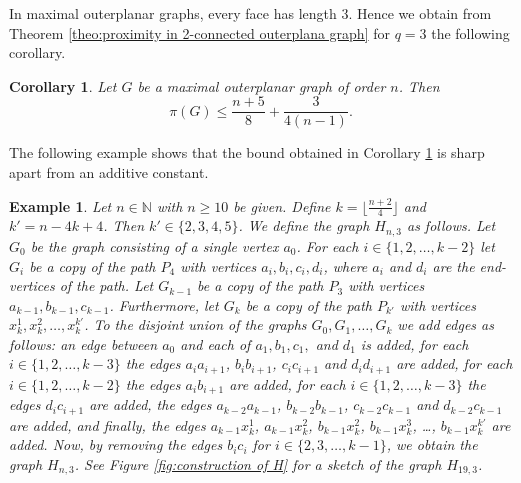 \documentclass[a4paper,11pt]{article}
\newtheorem{corollary}[theorem]%
{Corollary}
\newtheorem{example}{Example}[section]
\numberwithin{equation}{theorem}
\begin{document}
In maximal outerplanar graphs, every face has length $3$. Hence we obtain 
from Theorem \ref{theo:proximity in 2-connected outerplana graph} for $q=3$
the following corollary. 

\begin{corollary}  \label{coro:proximity-in-mops}
Let $G$ be a maximal outerplanar graph of order $n$. Then 
\[ \pi(G) \leq  \frac{n+5}{8} + \frac{3}{4(n-1)}. \]
\end{corollary}

The following example shows that the bound obtained in Corollary \ref{coro:proximity-in-mops}
is sharp apart from an additive constant.


\begin{example}{\rm
Let $n \in \mathbb{N}$ with $n \geq 10$ be given. 
Define $k = \lfloor \frac{n+2}{4}\rfloor$ and $k' = n-4k+4$. Then $k' \in \{2, 3, 4, 5\}$. 
We define the graph $H_{n,3}$ as follows. Let $G_0$ be the graph consisting of a single vertex $a_0$. 
For each $i \in \{1, 2, \ldots, k-2\}$ let $G_i$ be a copy of the path $P_4$ with vertices $a_i, b_i, c_i, d_i$, 
where $a_i$ and $d_i$ are the end-vertices of the path. Let $G_{k-1}$ be a copy of the path $P_3$ with vertices 
$a_{k-1}, b_{k-1}, c_{k-1}$. Furthermore, let $G_k$ be a copy of the path $P_{k'}$ with vertices 
$x^1_k, x^2_k, \ldots, x^{k'}_k$. To the disjoint union of the graphs 
$G_0, G_1, \ldots, G_k$ we add edges as follows: 
an edge between $a_0$ and each of  $a_1, b_1, c_1,$ and $d_1$ is added,  
for each $i \in \{1, 2, \ldots, k-3\}$ the edges $a_i a_{i+1}$, $b_i b_{i+1}$, $c_i c_{i+1}$ and $d_i d_{i+1}$ are added, 
for each $i \in \{1, 2, \ldots, k-2\}$ the edges $a_i b_{i+1}$ are added,  
for each $i \in \{1, 2, \ldots, k-3\}$ the edges $d_i c_{i+1}$ are added,  
the edges $a_{k-2} a_{k-1}$, $b_{k-2} b_{k-1}$, $c_{k-2} c_{k-1}$ and $d_{k-2} c_{k-1}$ are added,  
and finally, the edges $a_{k-1} x^1_k$, $a_{k-1} x^2_k$, $b_{k-1} x^2_k$, $b_{k-1} x^3_k$, \ldots, $b_{k-1} x^{k'}_k$ are added. 
Now, by removing the edges \( b_i c_i \) for \( i \in \{2, 3, \ldots, k-1\} \), we obtain the graph 
$H_{n,3}$. 
See Figure \ref{fig:construction of H} for a sketch of the graph $H_{19,3}$.

\begin{figure}[H]
	\begin{center}
\end{center}
\end{figure}}
\end{example}
\end{document}
